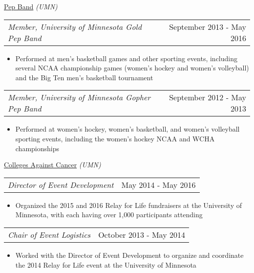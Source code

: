 \documentclass[10pt, letterpaper]{article}
\makeatletter
\newcommand{\headerrow}[2]
{\begin{tabular*}{\linewidth}{l@{\extracolsep{\fill}}r}
	#1 &
	#2 \\
\end{tabular*}}
\makeatother
\begin{document}
{{%
{\uline{Pep Band} \textit{(UMN)}}

\headerrow
	{\quad\textit{Member, University of Minnesota Gold Pep Band}}
	{September 2013 - May 2016}
	\begin{itemize}
		\item Performed at men's basketball games and other sporting events, including several NCAA championship games (women's hockey and women's volleyball) and the Big Ten men's basketball tournament
	\end{itemize}

\headerrow
	{\quad\textit{Member, University of Minnesota Gopher Pep Band}}
	{September 2012 - May 2013}
	\begin{itemize}
		\item Performed at women's hockey, women's basketball, and women's volleyball sporting events, including the women's hockey NCAA and WCHA championships
	\end{itemize}

{\uline{Colleges Against Cancer} \textit{(UMN)}}

\headerrow
	{\quad\textit{Director of Event Development}}
	{May 2014 - May 2016}
	\begin{itemize}
		\item Organized the 2015 and 2016 Relay for Life fundraisers at the University of Minnesota, with each having over 1,000 participants attending
	\end{itemize}

\headerrow
	{\quad\textit{Chair of Event Logistics}}
	{October 2013 - May 2014}
	\begin{itemize}
		\item Worked with the Director of Event Development to organize and coordinate the 2014 Relay for Life event at the University of Minnesota
	\end{itemize}


\begin{comment}
\subsection*{HONORS \& AWARDS:}


\end{comment}}}
\end{document}
